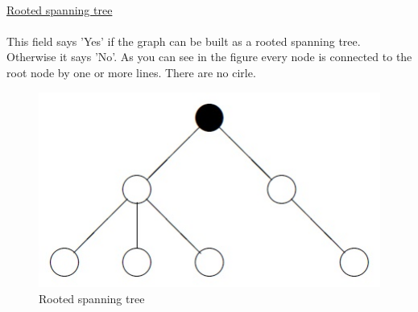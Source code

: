 \documentclass[12pt]{report}
\begin{document}
\\
\underline{Rooted spanning tree}\\
\\
This field says 'Yes' if the graph can be built as a rooted spanning tree. Otherwise it says 'No'.
As you can see in the figure every node is connected to the root node by one or more lines. There are no cirle.\\
\begin{figure}[h]
\centering
\includegraphics[scale=.6]{rootspant}
\caption{Rooted spanning tree}
\label{FIG:abb52}
\end{figure}
\\
\end{document}
